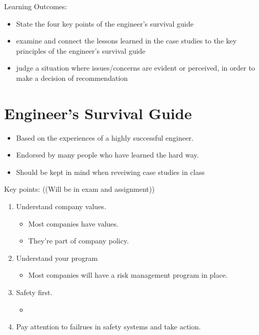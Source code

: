 \documentclass{article}
\begin{document}
Learning Outcomes:
\begin{itemize}
    \item State the four key points of the engineer's survival guide
    \item examine and connect the lessons learned in the case studies to the key principles of the engineer's survival guide
    \item judge a situation where issues/concerns are evident or perceived, in order to make a decision of recommendation
\end{itemize}
\section{Engineer's Survival Guide}
\begin{itemize}
    \item Based on the experiences of a highly successful engineer.
    \item Endorsed by many people who have learned the hard way.
    \item Should be kept in mind when reveiwing case studies in class
\end{itemize}
Key points:
((Will be in exam and assignment))
\begin{enumerate}
    \item Understand company values.
    \begin{itemize}
        \item Most companies have values.
        \item They're part of company policy.
    \end{itemize}
    \item Understand your program
    \begin{itemize}
        \item Most companies will have a risk management program in place.
    \end{itemize}
    \item Safety first.
    \begin{itemize}
        \item 
    \end{itemize}
    \item Pay attention to failrues in safety systems and take action.
\end{enumerate}
\end{document}
